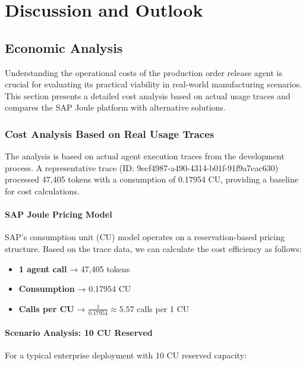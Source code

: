 \chapter{Discussion and Outlook}
\label{chap:Discussion}

\section{Economic Analysis}

Understanding the operational costs of the production order release agent is crucial for evaluating its practical viability in real-world manufacturing scenarios. This section presents a detailed cost analysis based on actual usage traces and compares the SAP Joule platform with alternative solutions.

\subsection{Cost Analysis Based on Real Usage Traces}

The analysis is based on actual agent execution traces from the development process. A representative trace (ID: 9ecf4987-a490-4314-b01f-91f9a7cac630) processed 47,405 tokens with a consumption of 0.17954 CU, providing a baseline for cost calculations.

\subsubsection{SAP Joule Pricing Model}

SAP's consumption unit (CU) model operates on a reservation-based pricing structure. Based on the trace data, we can calculate the cost efficiency as follows:

\begin{itemize}
    \item \textbf{1 agent call} → 47,405 tokens
    \item \textbf{Consumption} → 0.17954 CU
    \item \textbf{Calls per CU} → $\frac{1}{0.17954} \approx 5.57$ calls per 1 CU
\end{itemize}

\subsubsection{Scenario Analysis: 10 CU Reserved}

For a typical enterprise deployment with 10 CU reserved capacity:

